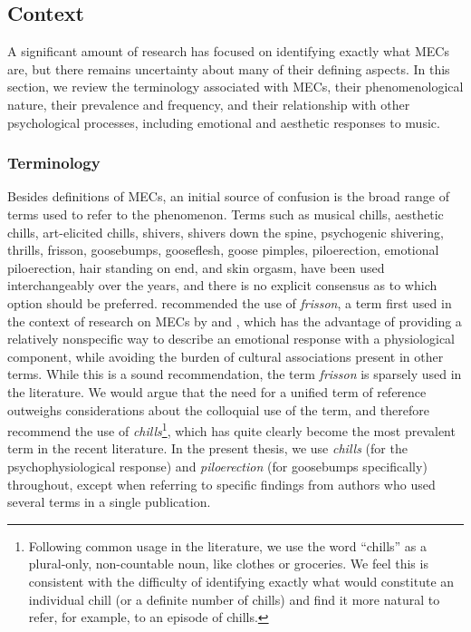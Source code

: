 \subsection{Context}
\label{se:rev-results-1}

A significant amount of research has focused on identifying exactly what MECs are, but there remains uncertainty about many of their defining aspects. In this section, we review the terminology associated with MECs, their phenomenological nature, their prevalence and frequency, and their relationship with other psychological processes, including emotional and aesthetic responses to music.

\subsubsection{Terminology}

Besides definitions of MECs, an initial source of confusion is the broad range of terms used to refer to the phenomenon. Terms such as musical chills, aesthetic chills, art-elicited chills, shivers, shivers down the spine, psychogenic shivering, thrills, frisson, goosebumps, gooseflesh, goose pimples, piloerection, emotional piloerection, hair standing on end, and skin orgasm, have been used interchangeably over the years, and there is no explicit consensus as to which option should be preferred. \textcite{harrison2014} recommended the use of \emph{frisson}, a term first used in the context of research on MECs by \textcite{huron2006} and \textcite{levinson2006}, which has the advantage of providing a relatively nonspecific way to describe an emotional response with a physiological component, while avoiding the burden of cultural associations present in other terms. While this is a sound recommendation, the term \emph{frisson} is sparsely used in the literature. We would argue that the need for a unified term of reference outweighs considerations about the colloquial use of the term, and therefore recommend the use of \emph{chills}\footnote{Following common usage in the literature, we use the word ``chills'' as a plural-only, non-countable noun, like clothes or groceries. We feel this is consistent with the difficulty of identifying exactly what would constitute an individual chill (or a definite number of chills) and find it more natural to refer, for example, to an episode of chills.}, which has quite clearly become the most prevalent term in the recent literature. In the present thesis, we use \emph{chills} (for the psychophysiological response) and \emph{piloerection} (for goosebumps specifically) throughout, except when referring to specific findings from authors who used several terms in a single publication.

